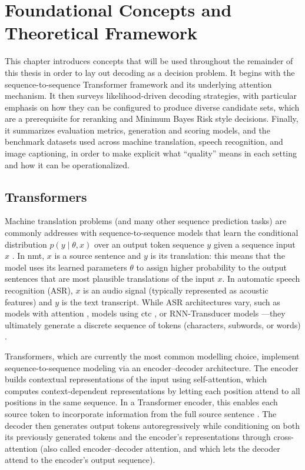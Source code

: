 \chapter{Foundational Concepts and Theoretical Framework}
\label{chapter:background}

This chapter introduces concepts that will be used throughout the remainder of this thesis in order to lay out decoding as a decision problem. It begins with the sequence-to-sequence Transformer framework and its underlying attention mechanism. It then surveys likelihood-driven decoding strategies, with particular emphasis on how they can be configured to produce diverse candidate sets, which are a prerequisite for reranking and Minimum Bayes Risk style decisions. Finally, it summarizes evaluation metrics, generation and scoring models, and the benchmark datasets used across machine translation, speech recognition, and image captioning, in order to make explicit what “quality” means in each setting and how it can be operationalized.


\section{Transformers}

Machine translation problems (and many other sequence prediction tasks) are commonly addresses with sequence-to-sequence models that learn the conditional distribution \(p(y \mid \theta, x)\) over an output token sequence \(y\) given a sequence input \(x\) \cite{sutskever2014seq2seq,bahdanau2015nmt,vaswani2017attention}. In \gls{nmt}, \(x\) is a source sentence and \(y\) is its translation: this means that the model uses its learned parameters $\theta$ to assign higher probability to the output sentences that are most plausible translations of the input \(x\). In automatic speech recognition (ASR), \(x\) is an audio signal (typically represented as acoustic features) and \(y\) is the text transcript. While ASR architectures vary, such as models with attention \cite{chan2016las}, models using \gls{ctc} \cite{graves2006ctc}, or RNN-Transducer models \cite{graves2012rnnt}—they ultimately generate a discrete sequence of tokens (characters, subwords, or words) \cite{sennrich2016bpe,schuster2012wordpiece,kudo2018sentencepiece}.

Transformers, which are currently the most common modelling choice, implement sequence-to-sequence modeling via an encoder--decoder architecture. The encoder builds contextual representations of the input using self-attention, which computes context-dependent representations by letting each position attend to all positions in the same sequence. In a Transformer encoder, this enables each source token to incorporate information from the full source sentence \cite{vaswani2017attention}. The decoder then generates output tokens autoregressively while conditioning on both its previously generated tokens and the encoder’s representations through cross-attention (also called encoder--decoder attention, and which lets the decoder attend to the encoder’s output sequence). 

